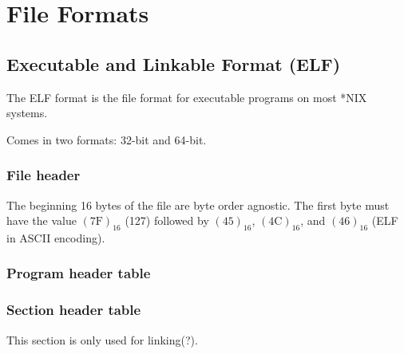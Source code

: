\chapter{File Formats}

\section{Executable and Linkable Format (ELF)}

The ELF format is the file format for executable programs on most *NIX systems.

Comes in two formats: 32-bit and 64-bit.

\begin{center}
\end{center}

\subsection{File header}

The beginning 16 bytes of the file are byte order agnostic.
The first byte must have the value $(7\text{F})_{16}$ (127) followed by
$(45)_{16}$, $(4\text{C})_{16}$, and $(46)_{16}$ (ELF in ASCII encoding).

\subsection{Program header table}

\subsection{Section header table}

This section is only used for linking(?).
